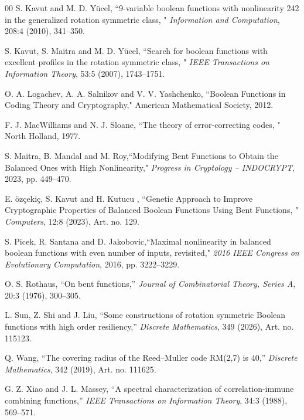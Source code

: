 \documentclass[11pt]{article}
\newtheorem{open problem}{Open problem}
\begin{document}
\begin{thebibliography}{00}
 S. Kavut and M. D. Y{\"u}cel,  ``9-variable boolean functions with nonlinearity 242 in the generalized rotation symmetric class, " \emph{Information and Computation}, 208:4 (2010), 341--350.

 S. Kavut, S. Maitra and M. D. Y{\"u}cel,  ``Search for boolean functions with excellent profiles in the rotation symmetric class, " \emph{IEEE Transactions on Information Theory}, 53:5 (2007), 1743--1751.

 O. A. Logachev, A. A. Salnikov and V. V. Yashchenko, ``Boolean Functions in Coding Theory and Cryptography," American Mathematical Society, 2012.

 F. J. MacWilliams and N. J. Sloane, ``The theory of error-correcting codes, "
North Holland, 1977.

 S. Maitra, B. Mandal and M. Roy,``Modifying Bent Functions to Obtain the Balanced Ones with High Nonlinearity," \emph{Progress in Cryptology -- INDOCRYPT}, 2023, pp. 449--470.

 E. {\"o}z{\c{c}}eki{\c{c}}, S. Kavut  and H. Kutucu , ``Genetic Approach to Improve Cryptographic Properties of Balanced Boolean Functions Using Bent Functions, " \emph{Computers}, 12:8 (2023), Art. no. 129.

 S. Picek, R. Santana and D. Jakobovic,``Maximal nonlinearity in balanced boolean functions with even number of inputs, revisited," \emph{2016 IEEE Congress on Evolutionary Computation}, 2016, pp. 3222--3229.

  O. S. Rothaus, ``On bent functions,'' \emph{Journal of Combinatorial Theory, Series A},  20:3 (1976), 300--305.

 L. Sun, Z. Shi and J. Liu, ``Some constructions of rotation symmetric Boolean functions with high order resiliency,'' \emph{Discrete Mathematics}, 349 (2026), Art. no. 115123.

 Q. Wang, ``The covering radius of the Reed--Muller code RM(2,7) is 40,'' \emph{Discrete Mathematics}, 342 (2019), Art. no. 111625.

 G. Z. Xiao and J. L. Massey, ``A spectral characterization of correlation-immune combining functions,'' \emph{IEEE Transactions on Information Theory}, 34:3 (1988), 569--571.

\end{thebibliography}
\end{document}
